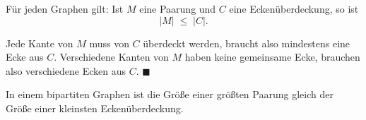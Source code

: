 \begin{merksatz}
Für jeden Graphen gilt: Ist $M$ eine Paarung und $C$ eine Eckenüberdeckung, so ist
\[ |M| \;\le\; |C| . \]

Jede Kante von $M$ muss von $C$ überdeckt werden, braucht also mindestens eine Ecke aus $C$. Verschiedene Kanten von $M$ haben keine gemeinsame Ecke, brauchen also verschiedene Ecken aus $C$. $\blacksquare$

\begin{center}
\begin{minipage}{0.88\textwidth}
\end{minipage}
\end{center}
\end{merksatz}

\begin{merksatz}
In einem bipartiten Graphen ist die Größe einer größten Paarung gleich der Größe einer kleinsten Eckenüberdeckung.
\end{merksatz}

